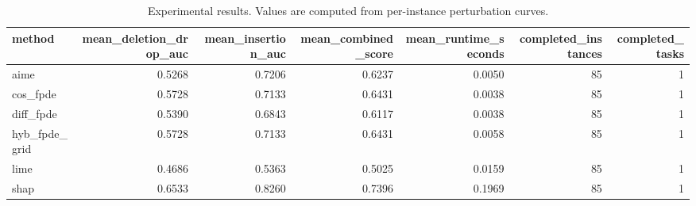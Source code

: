 \begin{table}[t]
\caption{Experimental results. Values are computed from per-instance perturbation curves.}
\label{tab:main_results_computed}
\centering
\begin{tabular}{lrrrrrr}
\toprule
method & mean\_deletion\_drop\_auc & mean\_insertion\_auc & mean\_combined\_score & mean\_runtime\_seconds & completed\_instances & completed\_tasks \\
\midrule
aime & 0.5268 & 0.7206 & 0.6237 & 0.0050 & 85 & 1 \\
cos\_fpde & 0.5728 & 0.7133 & 0.6431 & 0.0038 & 85 & 1 \\
diff\_fpde & 0.5390 & 0.6843 & 0.6117 & 0.0038 & 85 & 1 \\
hyb\_fpde\_grid & 0.5728 & 0.7133 & 0.6431 & 0.0058 & 85 & 1 \\
lime & 0.4686 & 0.5363 & 0.5025 & 0.0159 & 85 & 1 \\
shap & 0.6533 & 0.8260 & 0.7396 & 0.1969 & 85 & 1 \\
\bottomrule
\end{tabular}

\end{table}
